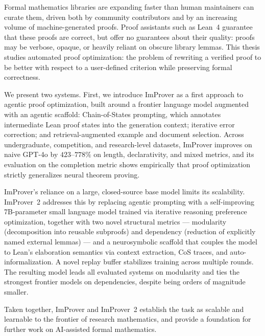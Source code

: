 Formal mathematics libraries are expanding faster than human maintainers can curate them, driven both by community contributors and by an increasing volume of machine-generated proofs. Proof assistants such as Lean~4 guarantee that these proofs are correct, but offer no guarantees about their quality: proofs may be verbose, opaque, or heavily reliant on obscure library lemmas. This thesis studies automated proof optimization: the problem of rewriting a verified proof to be better with respect to a user-defined criterion while preserving formal correctness.

We present two systems. First, we introduce ImProver as a first approach to agentic proof optimization, built around a frontier language model augmented with an agentic scaffold: Chain-of-States prompting, which annotates intermediate Lean proof states into the generation context; iterative error correction; and retrieval-augmented example and document selection. Across undergraduate, competition, and research-level datasets, ImProver improves on naive GPT-4o by $423$--$778\%$ on length, declarativity, and mixed metrics, and its evaluation on the completion metric shows empirically that proof optimization strictly generalizes neural theorem proving.

ImProver's reliance on a large, closed-source base model limits its scalability. ImProver~2 addresses this by replacing agentic prompting with a self-improving 7B-parameter small language model trained via iterative reasoning preference optimization, together with two novel structural metrics --- modularity (decomposition into reusable subproofs) and dependency (reduction of explicitly named external lemmas) --- and a neurosymbolic scaffold that couples the model to Lean's elaboration semantics via context extraction, CoS traces, and auto-informalization. A novel replay buffer stabilizes training across multiple rounds. The resulting model leads all evaluated systems on modularity and ties the strongest frontier models on dependencies, despite being orders of magnitude smaller.

Taken together, ImProver and ImProver~2 establish the task as scalable and learnable to the frontier of research mathematics, and provide a foundation for further work on AI-assisted formal mathematics.
